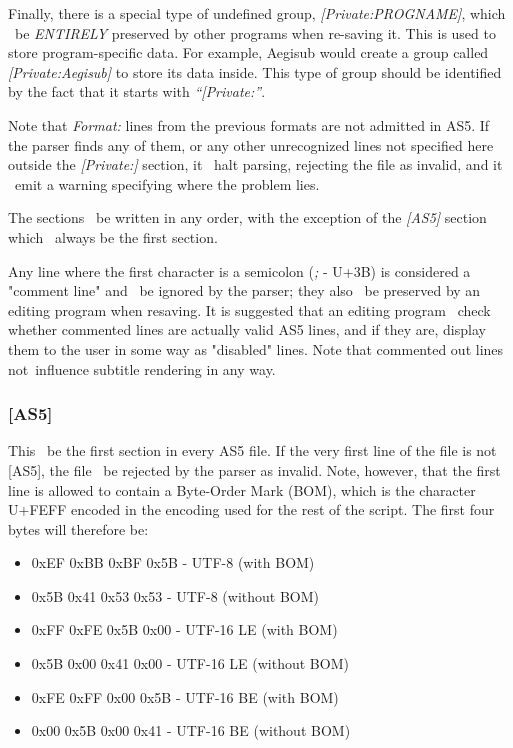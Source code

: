 \documentclass{spec}
\begin{document}
Finally, there is a special type of undefined group, \emph{[Private:PROGNAME]}, which 
\must\ be \emph{ENTIRELY} preserved by other programs when re-saving it. This is used to
store program-specific data. For example, Aegisub would create a group called
\emph{[Private:Aegisub]} to store its data inside. This type of group should be identified
by the fact that it starts with \emph{``[Private:''}.

Note that \emph{Format:} lines from the previous formats are not admitted in AS5. If the parser
finds any of them, or any other unrecognized lines not specified here outside the \emph{[Private:]}
section, it \must\ halt parsing, rejecting the file as invalid, and it \should\ emit a warning
specifying where the problem lies.

The sections \may\ be written in any order, with the exception of the \emph{[AS5]} section which
\must\ always be the first section.

Any line where the first character is a semicolon (\textit{;} - U+3B) is considered a "comment line"
and \must\ be ignored by the parser; they also \must\ be preserved by an editing program when resaving.
It is suggested that an editing program \should\ check whether commented lines are actually valid AS5
lines, and if they are, display them to the user in some way as "disabled" lines. Note that commented
out lines \must not\ influence subtitle rendering in any way.

\subsubsection{[AS5]}
This \must\ be the first section in every AS5 file. If the very first line of the file is not
[AS5], the file \must\ be rejected by the parser as invalid. Note, however, that the first
line is allowed to contain a Byte-Order Mark (BOM), which is the character U+FEFF encoded in
the encoding used for the rest of the script\cite{Unicode BOM}. The first four bytes will therefore be:

\begin{itemize}
\item 0xEF 0xBB 0xBF 0x5B - UTF-8 (with BOM)
\item 0x5B 0x41 0x53 0x53 - UTF-8 (without BOM)
\item 0xFF 0xFE 0x5B 0x00 - UTF-16 LE (with BOM)
\item 0x5B 0x00 0x41 0x00 - UTF-16 LE (without BOM)
\item 0xFE 0xFF 0x00 0x5B - UTF-16 BE (with BOM)
\item 0x00 0x5B 0x00 0x41 - UTF-16 BE (without BOM)
\end{itemize}
\end{document}
